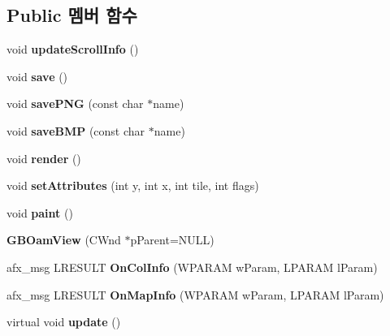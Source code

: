\subsection*{Public 멤버 함수}
\begin{DoxyCompactItemize}
\item 
\mbox{\label{class_g_b_oam_view_a20ce1c6ed837362872920c23e281e523}} 
void {\bfseries update\+Scroll\+Info} ()
\item 
\mbox{\label{class_g_b_oam_view_a04f7a345e1f9d71b149b9df3b2db30d4}} 
void {\bfseries save} ()
\item 
\mbox{\label{class_g_b_oam_view_a06b80040df2b94b034d5b0822ebc27ed}} 
void {\bfseries save\+P\+NG} (const char $\ast$name)
\item 
\mbox{\label{class_g_b_oam_view_a03a02a1b15d607e9891e58695dcfd7dc}} 
void {\bfseries save\+B\+MP} (const char $\ast$name)
\item 
\mbox{\label{class_g_b_oam_view_a6862114f9b3873d08f7ae8bd465c2eda}} 
void {\bfseries render} ()
\item 
\mbox{\label{class_g_b_oam_view_a16e71e6ba20139f7ede42b3c884597d7}} 
void {\bfseries set\+Attributes} (int y, int x, int tile, int flags)
\item 
\mbox{\label{class_g_b_oam_view_a8ed062f5cac9239a17b0f5942a5d9e5b}} 
void {\bfseries paint} ()
\item 
\mbox{\label{class_g_b_oam_view_a3e2e1ed3de07569a08af410042e1ba8f}} 
{\bfseries G\+B\+Oam\+View} (C\+Wnd $\ast$p\+Parent=N\+U\+LL)
\item 
\mbox{\label{class_g_b_oam_view_a3b0623e23cfd8b04d576baed34f4d12d}} 
afx\+\_\+msg L\+R\+E\+S\+U\+LT {\bfseries On\+Col\+Info} (W\+P\+A\+R\+AM w\+Param, L\+P\+A\+R\+AM l\+Param)
\item 
\mbox{\label{class_g_b_oam_view_af5f1f2fd340a83cbf218ef8be53f4089}} 
afx\+\_\+msg L\+R\+E\+S\+U\+LT {\bfseries On\+Map\+Info} (W\+P\+A\+R\+AM w\+Param, L\+P\+A\+R\+AM l\+Param)
\item 
\mbox{\label{class_g_b_oam_view_a4e4dc00c48996d9fb2dc1169b65b4cc8}} 
virtual void {\bfseries update} ()
\end{DoxyCompactItemize}
